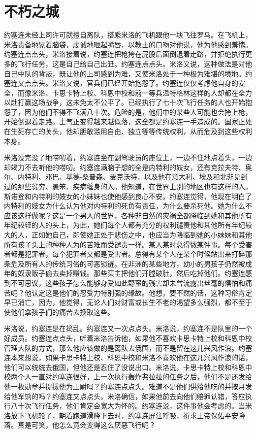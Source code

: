 \chapter{不朽之城}
 
    约塞连未经上司许可就擅自离队，搭乘米洛的飞机跟他一块飞往罗马。在飞机上，米洛责备地晃着脑袋，虔诚地咂起嘴唇，以教士的口吻对他说，他为他感到羞愧。约塞连点点头，米洛接着说，约塞连把枪挎在屁股后面倒退着走路，并拒绝执行更多的飞行任务，这是自己给自己出丑。约塞连点点头。米洛又说，这种做法是对他自己中队的背叛，既让他的上司感到为难，又使米洛处于一种极为难堪的境地。约塞连又点点头。米洛又说，官兵们已经开始抱怨了。约塞连仅仅考虑他自身的安全，而像米洛、卡思卡特上校、科恩中校和前一等兵温特格林这样的人却都在全力以赴打赢这场战争，这未免太不公平了。已经执行了七十次飞行任务的人也开始抱怨了，因为他们不得不飞满八十次。危险的是，他们中的某些人可能也会挎上枪，开始倒退着走路。士气正变得越来越低落，这全都是约塞连一手造成的。国家正处在生死存亡的关头，他却胆敢滥用自由、独立等等传统权利，从而危及到这些权利本身。

    米洛没完没了地唠叨着，约塞连坐在副驾驶员的座位上，一边不住地点着头，一边却竭力不去听他的唠叨。约塞连满脑子想的全是内特利的妓女，还有克拉夫特、奥尔、内特利、邓巴、基德-桑普森、麦克沃特，以及他在意大利、埃及和北非见到过的那些贫穷、愚笨、疾病缠身的人。他知道，在世界上别的地区也有这样的人。斯诺登和内特利的妓女的小妹妹也使他感到良心不安。约塞连觉得，他现在明白了内特利的妓女为什么认为他对内特利的死负有责任，为什么要杀死他。她为什么不应该这样做呢？这是一个男人的世界，各种非自然的灾祸全都降临到她和其他所有年纪较轻的人的头上，为此，她们每个人都有充分的权利谴责他和其他所有年纪较大的人，正如她自己，即使她正处于悲伤之中，也应当为降临到她的小妹妹和其他所有孩子头上的种种人为的苦难而受谴责一样。某人某时总得做某件事。每个受害者都是犯罪者，每个犯罪者又都是受害者。总得有某个人在某个时候站出来打碎那条危及所有人的传统习俗的可恶锁链。在非洲的某些地方，幼小的男孩子仍然被成年的奴隶贩子偷去卖掉赚钱。那些买主把他们开膛破肚，然后吃掉他们。约塞连感到不可思议，这些孩子怎么能够身受如此野蛮的残害却未曾流露出丝毫的惧怕和痛苦呢？他认定这是他们的忍受力特别强的缘故。他想，要不然的话，这种习俗肯定早已消亡，因为，他觉得，无论人们对财富或长生不老的渴望多么强烈，都不至于使他们拿孩子们的痛苦去换取这些。

    米洛说，约塞连是在捣乱。约塞连又一次点点头。米洛说，约塞连不是队里的一个好成员。约塞连点点头，听着米洛告诉他，如果他不喜欢卡思卡特上校和科恩中校管理大队的方式，那么他应该做的是离队去俄国，而不是留在这儿兴风作浪。约塞连本来想说，如果卡思卡特上校、科恩中校和米洛不喜欢他在这儿兴风作浪的话，他们可以统统去俄国，但他还是忍住了没说出口。米洛说，卡思卡特上校和科恩中校两个人一直对约塞连很好，上一次执行轰炸弗拉拉的任务之后，他们不是还发给他一枚勋章并提拔他为上尉吗？约塞连点点头。难道不是他们供给他吃的并按月发给他军饷的吗？约塞连又点点头。米洛确信，如果他前去向他们赔罪认错，答应执行八十次飞行任务，他们肯定会宽大为怀的。约塞连说，这件事他会考虑的。当米洛放下飞机轮子，朝着跑道滑降下去时，约塞连屏住呼吸，祈求上帝保佑平安降落。真是可笑，他怎么竟会变得这么厌恶飞行呢？

